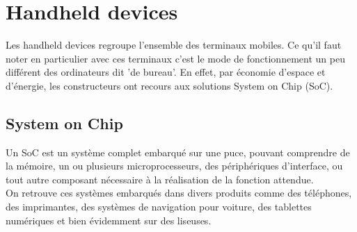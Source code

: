 \newpage

\section{Handheld devices}
Les handheld devices regroupe l'ensemble des terminaux mobiles. Ce qu'il faut noter en particulier avec ces terminaux c'est le mode de fonctionnement un peu différent des ordinateurs dit 'de bureau'. En effet, par économie d'espace et d'énergie, les constructeurs ont recours aux solutions System on Chip (SoC).

\subsection{System on Chip}
Un SoC est un système complet embarqué sur une puce, pouvant comprendre de la mémoire, un ou plusieurs microprocesseurs, des périphériques d'interface, ou tout autre composant nécessaire à la réalisation de la fonction attendue.
\\On retrouve ces systèmes embarqués dans divers produits comme des téléphones, des imprimantes, des systèmes de navigation pour voiture, des tablettes numériques et bien évidemment sur des liseuses.